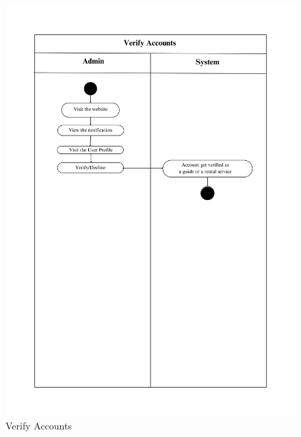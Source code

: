 \begin{figure}[h]
    \centering
    \includegraphics[width=1\textwidth]{Images/Activity Diagrams/6 Verify Accounts.png}
    \caption{Verify Accounts}
    \label{fig:activity-verify}
\end{figure}

